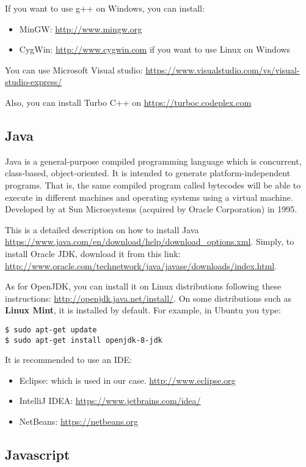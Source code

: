 \documentclass{KodeBook}
\begin{document}
If you want to use g++ on Windows, you can install:
\begin{itemize}
	\item MinGW: \url{http://www.mingw.org} 
	\item CygWin: \url{http://www.cygwin.com} if you want to use Linux on Windows
\end{itemize}

You can use Microsoft Visual studio: \url{https://www.visualstudio.com/vs/visual-studio-express/}

Also, you can install Turbo C++ on \url{https://turboc.codeplex.com}

\subsection{Java}

Java is a general-purpose compiled programming language which is concurrent, class-based, object-oriented. 
It is intended to generate platform-independent programs. 
That is, the same compiled program called bytecodes will be able to execute in different machines and operating systems using a virtual machine. 
Developed by  at Sun Microsystems (acquired by Oracle Corporation) in 1995.

This is a detailed description on how to install Java \url{https://www.java.com/en/download/help/download_options.xml}.
Simply, to install Oracle JDK, download it from this link: \url{http://www.oracle.com/technetwork/java/javase/downloads/index.html}. 

As for OpenJDK, you can install it on Linux distributions following these instructions: \url{http://openjdk.java.net/install/}. 
On some distributions such as \textbf{Linux Mint}, it is installed by default.
For example, in Ubuntu you type:
\begin{lstlisting}[style=shellStyle]
$ sudo apt-get update
$ sudo apt-get install openjdk-8-jdk
\end{lstlisting}

It is recommended to use an IDE:
\begin{itemize}
	\item Eclipse: which is used in our case. \url{http://www.eclipse.org}
	\item IntelliJ IDEA: \url{https://www.jetbrains.com/idea/}
	\item NetBeans: \url{https://netbeans.org}
\end{itemize}

\subsection{Javascript}
\end{document}
